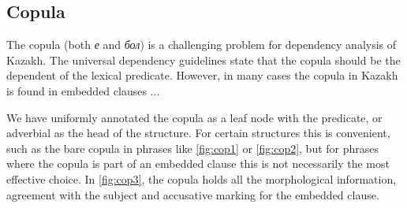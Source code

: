 \documentclass[a4paper,11pt, onecolumn,twoside]{article}
\begin{document}
\subsection{Copula}

The copula (both \emph{е} and \emph{бол}) is a challenging problem for dependency 
analysis of Kazakh. The universal dependency guidelines state that the copula should
be the dependent of the lexical predicate. However, in many cases the copula in Kazakh
is found in embedded clauses ...

We have uniformly annotated the copula as a leaf node with the predicate, or adverbial
as the head of the structure. For certain structures this is convenient, such as the
bare copula in phrases like \ref{fig:cop1} or \ref{fig:cop2}, but for phrases where
the copula is part of an embedded clause this is not necessarily the most  
effective choice. In \ref{fig:cop3}, the copula holds all the morphological information,
agreement with the subject and accusative marking for the embedded clause.
\end{document}
